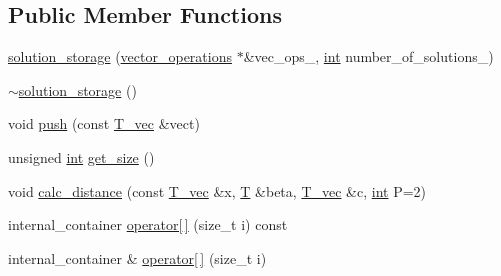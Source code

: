 \subsection*{Public Member Functions}
\begin{DoxyCompactItemize}
\item 
\hyperlink{classsolution__storage_ab0be980cd42394b17ac947838ae38993}{solution\-\_\-storage} (\hyperlink{container__test_8cpp_aca3cc0310428d338f3a165c7823d6499}{vector\-\_\-operations} $\ast$\&vec\-\_\-ops\-\_\-, \hyperlink{classint}{int} number\-\_\-of\-\_\-solutions\-\_\-)
\item 
\hyperlink{classsolution__storage_a5a97a2409e4499d9218ddbb887ad780e}{$\sim$solution\-\_\-storage} ()
\item 
void \hyperlink{classsolution__storage_aafb4b98b6213118b0abd0b8720e02cac}{push} (const \hyperlink{classsolution__storage_ae62caec157857515e58957a7e0f02cef}{T\-\_\-vec} \&vect)
\item 
unsigned \hyperlink{classint}{int} \hyperlink{classsolution__storage_addf1e8fb5492d79481bcbb847567dbce}{get\-\_\-size} ()
\item 
void \hyperlink{classsolution__storage_ac5956d5c2edd78e8fe314451f05d52f6}{calc\-\_\-distance} (const \hyperlink{classsolution__storage_ae62caec157857515e58957a7e0f02cef}{T\-\_\-vec} \&x, \hyperlink{classsolution__storage_a8de9429eee6a772dca6a68e230943428}{T} \&beta, \hyperlink{classsolution__storage_ae62caec157857515e58957a7e0f02cef}{T\-\_\-vec} \&c, \hyperlink{classint}{int} P=2)
\item 
internal\-\_\-container \hyperlink{classsolution__storage_a73f8bbc539fc533d0509a57f1e75a38d}{operator\mbox{[}$\,$\mbox{]}} (size\-\_\-t i) const 
\item 
internal\-\_\-container \& \hyperlink{classsolution__storage_a86ce5e4374b954075877e01d85f1ecfe}{operator\mbox{[}$\,$\mbox{]}} (size\-\_\-t i)
\end{DoxyCompactItemize}


